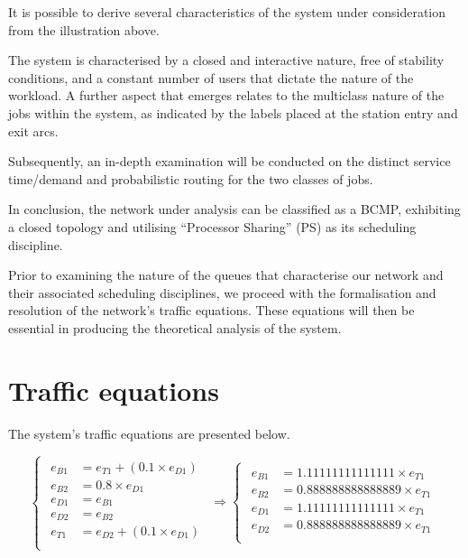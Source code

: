 It is possible to derive several characteristics of the system under consideration from the illustration above.

The system is characterised by a closed and interactive nature, free of stability conditions, and a constant number of users that dictate the nature of the workload.
A further aspect that emerges relates to the multiclass nature of the jobs within the system, as indicated by the labels placed at the station entry and exit arcs.

Subsequently, an in-depth examination will be conducted on the distinct service time/demand and probabilistic routing for the two classes of jobs.

In conclusion, the network under analysis can be classified as a BCMP, exhibiting a closed topology and utilising ``Processor Sharing'' (PS) as its scheduling discipline.

Prior to examining the nature of the queues that characterise our network and their associated scheduling disciplines, we proceed with the formalisation and resolution of the network's traffic equations.
These equations will then be essential in producing the theoretical analysis of the system.

\section{Traffic equations}

The system's traffic equations are presented below.

\[
\begin{cases}
\begin{aligned}
e_{B1} &= e_{T1} + (0.1 \times e_{D1}) \\
e_{B2} &= 0.8 \times e_{D1} \\
e_{D1} &= e_{B1} \\
e_{D2} &= e_{B2} \\
e_{T1} &= e_{D2} + (0.1 \times e_{D1}) \\
\end{aligned}
\end{cases}
\Rightarrow
\begin{cases}
\begin{aligned}
e_{B1} &= \num[round-mode=places, round-precision=4]{1.11111111111111} \times e_{T1}  \\
e_{B2} &= \num[round-mode=places, round-precision=4]{0.888888888888889} \times e_{T1}  \\
e_{D1} &= \num[round-mode=places, round-precision=4]{1.11111111111111} \times e_{T1}  \\
e_{D2} &= \num[round-mode=places, round-precision=4]{0.888888888888889} \times e_{T1}  \\
\end{aligned}
\end{cases}
\]

